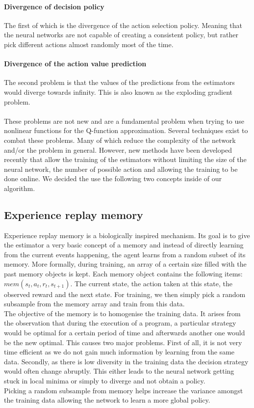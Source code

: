 \paragraph{Divergence of decision policy}
The first of which is the divergence of the action selection policy. Meaning that the neural networks are not capable of creating a consistent policy, but rather pick different actions almost randomly most of the time.
\paragraph{Divergence of the action value prediction}
The second problem is that the values of the predictions from the estimators would diverge towards infinity. This is also known as the exploding gradient problem.\\
\mbox{}\\
These problems are not new and are a fundamental problem when trying to use nonlinear functions for the Q-function approximation. Several techniques exist to combat these problems. Many of which reduce the complexity of the network and/or the problem in general. However, new methods have been developed recently that allow the training of the estimators without limiting the size of the neural network, the number of possible action and allowing the training to be done online. We decided the use the following two concepts inside of our algorithm.
\subsection{Experience replay memory}
Experience replay memory \cite{Mnih2015} is a biologically inspired mechanism. Its goal is to give the estimator a very basic concept of a memory and instead of directly learning from the current events happening, the agent learns from a random subset of its memory. More formally, during training, an array of a certain size filled with the past memory objects is kept. Each memory object contains the following items: $mem(s_t, a_t, r_t, s_{t+1})$. The current state, the action taken at this state, the observed reward and the next state. For training, we then simply pick a random subsample from the memory array and train from this data.
\\
The objective of the memory is to homogenise the training data. It arises from the observation that during the execution of a program, a particular strategy would be optimal for a certain period of time and afterwards another one would be the new optimal. This causes two major problems. First of all, it is not very time efficient as we do not gain much information by learning from the same data. Secondly, as there is low diversity in the training data the decision strategy would often change abruptly. This either leads to the neural network getting stuck in local minima or simply to diverge and not obtain a policy. \\
Picking a random subsample from memory helps increase the variance amongst the training data allowing the network to learn a more global policy. 

